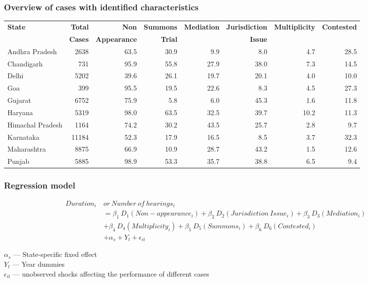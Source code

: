 \documentclass[10pt,aspectratio=169]{beamer}
\begin{document}
\begin{frame}
  \frametitle{Overview of cases with identified characteristics}
  \footnotesize
  \begin{longtable}{@{}lrrrrrrr@{}}
    \toprule
\multirow{2}{*}{\textbf{State}} & \textbf{Total}& \textbf{Non} & \textbf{Summons} & \textbf{Mediation} & \textbf{Jurisdiction} & \textbf{Multiplicity} & \textbf{Contested} \\
& \textbf{Cases} & \textbf{Appearance} & \textbf{Trial} & & \textbf{Issue} & &\\
\midrule
  Andhra Pradesh & 2638 & 63.5 & 30.9 & 9.9 & 8.0 & 4.7 & 28.5\\
  Chandigarh & 731 & 95.9 & 55.8 & 27.9 & 38.0 & 7.3 & 14.5\\
  Delhi & 5202 & 39.6 & 26.1 & 19.7 & 20.1 & 4.0 & 10.0\\
  Goa & 399 & 95.5 & 19.5 & 22.6 & 8.3 & 4.5 & 27.3\\
  Gujarat & 6752 & 75.9 & 5.8 & 6.0 & 45.3 & 1.6 & 11.8\\
  Haryana & 5319 & 98.0 & 63.5 & 32.5 & 39.7 & 10.2 & 11.3\\
  Himachal Pradesh & 1164 & 74.2 & 30.2 & 43.5 & 25.7 & 2.8 & 9.7\\
  Karnataka & 11184 & 52.3 & 17.9 & 16.5 & 8.5 & 3.7 & 32.3\\
  Maharashtra & 8875 & 66.9 & 10.9 & 28.7 & 43.2 & 1.5 & 12.6\\
  Punjab & 5885 & 98.9 & 53.3 & 35.7 & 38.8 & 6.5 & 9.4\\
  \bottomrule
  \end{longtable}
\end{frame}

\begin{frame}
  \frametitle{Regression model}
  \begin{equation*}
    \begin{split}
      Duration_i \ & or \ Number \ of \ hearings_i \\
      & = \beta_1 \ D_1(Non-appearance_i) + \beta_2 \ D_2(Jurisdiction \ Issue_i) + \beta_3 \ D_3(Mediation_i) \\
      & + \beta_4 \ D_4(Multiplicity_i) + \beta_5 \ D_5(Summons_i) + \beta_6 \ D_6(Contested_i) \\
      & + \alpha_s + Y_t + \epsilon_{it}
    \end{split}
  \end{equation*}
  
$\alpha_s$ --- State-specific fixed effect\\
$Y_t$ --- Year dummies\\
$\epsilon_{it}$ --- unobserved shocks affecting the performance of different cases
\end{frame}
\end{document}
